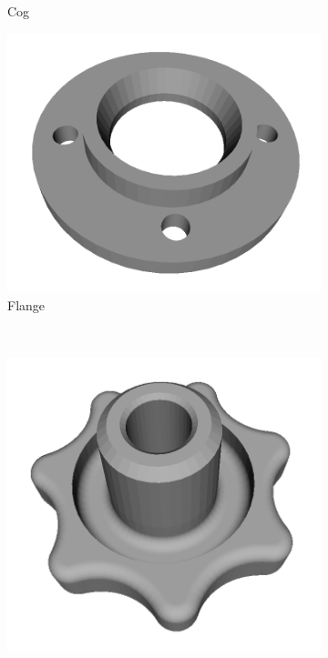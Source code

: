 \begin{figure}[t]
\begin{subfigure}[b]{0.16\linewidth}
		\caption{Cog}
	\end{subfigure}
	\begin{subfigure}[b]{0.16\linewidth} \centering
		\includegraphics[width=1\linewidth]{./fig/eval/toshiba_flange1.png}
		\caption{Flange}
	\end{subfigure} \\ 
	\begin{subfigure}[b]{0.16\linewidth} \centering
		\includegraphics[width=1\linewidth]{./fig/eval/toshiba_knob1.png}

\end{subfigure}
\end{figure}
